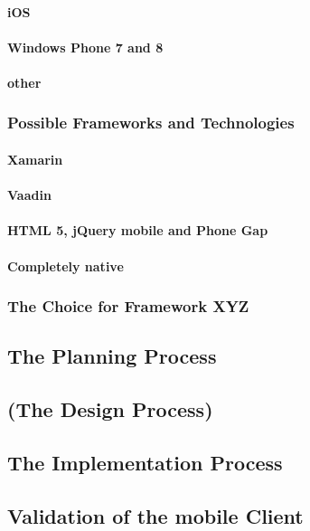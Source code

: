 \paragraph{iOS}
\paragraph{Windows Phone 7 and 8}
\paragraph{other}
\subsubsection{Possible Frameworks and Technologies}
\paragraph{Xamarin}
\paragraph{Vaadin}
\paragraph{HTML 5, jQuery mobile and Phone Gap}
\paragraph{Completely native}
\subsubsection{The Choice for Framework XYZ}
\subsection{The Planning Process}
\label{sec:Planning}
\subsection{(The Design Process)}
\label{sec:Design}
\subsection{The Implementation Process}
\label{sec:Implementation}
\subsection{Validation of the mobile Client}
\label{sec:Validation}